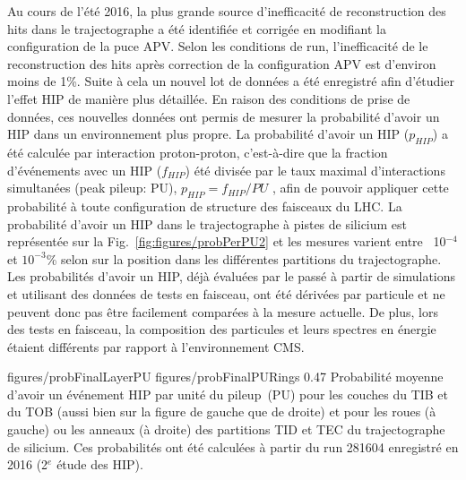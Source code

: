 Au cours de l'été 2016, la plus grande source d'inefficacité de reconstruction des hits dans le trajectographe a été identifiée et corrigée en modifiant la configuration de la puce APV. Selon les conditions de run, l'inefficacité de le reconstruction des hits après correction de la configuration APV est d'environ moins de 1\%. Suite à cela un nouvel lot de données a été enregistré afin d'étudier l'effet HIP de manière plus détaillée. En raison des conditions de prise de données, ces nouvelles données ont permis de mesurer la probabilité d'avoir un HIP dans un environnement plus propre. La probabilité d'avoir un HIP ($p_{HIP}$) a été calculée par interaction proton-proton, c'est-à-dire que la fraction d'événements avec un HIP ($f_{HIP}$) été divisée par le taux maximal d'interactions simultanées (peak pileup: PU), $p_{HIP} = f_{HIP}/PU$ , afin de pouvoir appliquer cette probabilité à toute configuration de structure des faisceaux du LHC. La probabilité d'avoir un HIP dans le trajectographe à pistes de silicium est représentée sur la Fig.~\ref{fig:figures/probPerPU2} et les mesures varient entre ~10$^{-4} $ et $ 10^{-3}$\% selon sur la position dans les différentes partitions du trajectographe. Les probabilités d'avoir un HIP, déjà évaluées par le passé à partir de simulations et utilisant des données de tests en faisceau, ont été dérivées par particule et ne peuvent donc pas être facilement comparées à la mesure actuelle. De plus, lors des tests en faisceau, la composition des particules et leurs spectres en énergie étaient différents par rapport à l'environnement CMS.

                 {figures/probFinalLayerPU} %
                 {figures/probFinalPURings} %
                 {0.47}       %
                 { Probabilité moyenne d'avoir un événement HIP par unité du pileup~(PU) pour les couches du TIB et du TOB (aussi bien sur la figure  de gauche que de droite) et pour les roues (à gauche) ou les anneaux (à droite) des partitions TID et TEC du trajectographe de silicium. Ces probabilités ont été calculées à partir du run 281604 enregistré en 2016 (2$^e$ étude des HIP).}


